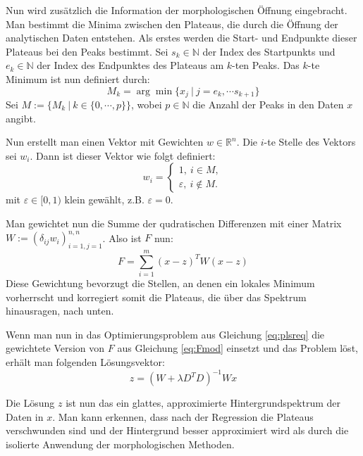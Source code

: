 \documentclass{article}
\newcommand{\R}[0]{\mathbb{R}}
\newcommand{\N}[0]{\mathbb{N}}
\theoremstyle{plain}
\theoremstyle{definition}
\begin{document}
Nun wird zusätzlich die Information der morphologischen Öffnung eingebracht.
Man bestimmt die Minima zwischen den Plateaus, die durch die Öffnung der analytischen Daten entstehen. 
Als erstes werden die Start- und Endpunkte dieser Plateaus bei den Peaks bestimmt.
Sei $s_k \in \N$ der Index des Startpunkts und $e_k \in \N$ der Index des Endpunktes des Plateaus am $k$-ten Peaks. Das $k$-te Minimum ist nun definiert durch:
\begin{equation}
    M_k = \arg\min \{x_j \: | \: j=e_k,\cdots s_{k+1}\}
\end{equation}
Sei $M := \{M_k \: | \: k \in \{0, \cdots, p\}\}$, wobei $p \in \mathbb{N}$ die Anzahl der Peaks in den Daten $x$ angibt.

Nun erstellt man einen Vektor mit Gewichten $w \in \R^n$. Die $i$-te Stelle des Vektors sei $w_i$. Dann ist dieser Vektor wie folgt definiert:
\begin{equation}
    w_i = \begin{cases}
        1, \: i \in M, \\
        \varepsilon, \: i \notin M.
    \end{cases}
\end{equation} 
mit $\varepsilon \in [0, 1)$ klein gewählt, z.B. $\varepsilon = 0$.

Man gewichtet nun die Summe der qudratischen Differenzen mit einer Matrix $W := (\delta_{ij} w_i)_{i=1, j=1}^{n,n}$. Also ist $F$ nun:
\begin{equation}\label{eq:Fmod}
    F = \sum\limits_{i=1}^m (x-z)^TW(x-z)
\end{equation}
Diese Gewichtung bevorzugt die Stellen, an denen ein lokales Minimum vorherrscht und korregiert somit die Plateaus, die über das Spektrum hinausragen, nach unten.

Wenn man nun in das Optimierungsproblem aus Gleichung \ref{eq:plsreq} die gewichtete Version von $F$ aus Gleichung \ref{eq:Fmod} einsetzt und das Problem löst, erhält man folgenden Lösungsvektor:
\begin{equation}
    z = (W + \lambda D^TD)^{-1}Wx
\end{equation}

Die Lösung $z$ ist nun das ein glattes, approximierte Hintergrundspektrum der Daten in $x$.
Man kann erkennen, dass nach der Regression die Plateaus verschwunden sind und der Hintergrund besser approximiert wird als durch die isolierte Anwendung der morphologischen Methoden. 

\clearpage

\end{document}
